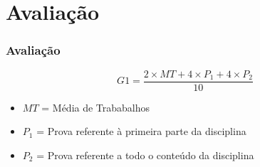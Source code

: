 \documentclass[aspectratio=169]{beamer}
\begin{document}
\section{Avalia\c{c}\~ao}

\begin{frame}\frametitle{Avalia\c{c}\~ao}
\[
G1 = \frac{ 2 \times MT + 4 \times P_1 + 4 \times P_2}{10}
\]
\begin{itemize}
	\item $MT$ = Média de Trababalhos
 	\item $P_1$ = Prova referente à primeira parte da disciplina
	\item $P_2$ = Prova referente a todo o conteúdo da disciplina
\end{itemize}
\end{frame}

\end{document}
